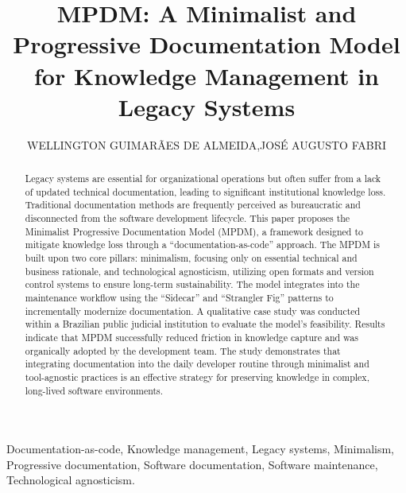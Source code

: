 \documentclass{ieeeaccess}
\begin{document}

\title{MPDM: A Minimalist and Progressive Documentation Model for Knowledge Management in Legacy Systems}

\author{\uppercase{Wellington Guimarães de Almeida},\uppercase{José Augusto Fabri}}

\address[1]{Graduate Program in Informatics (PPGI), Federal University of Technology -- Paraná (UTFPR), Cornélio Procópio, PR 86300-000, Brazil (e-mail: fabri@utfpr.edu.br)}
\address[2]{Regional Labor Court of the 3rd Region (TRT-MG), Belo Horizonte, MG 30170-910, Brazil (e-mail: walmeida@trt3.jus.br)}


\begin{abstract}
Legacy systems are essential for organizational operations but often suffer from a lack of updated technical documentation, leading to significant institutional knowledge loss. Traditional documentation methods are frequently perceived as bureaucratic and disconnected from the software development lifecycle. This paper proposes the Minimalist Progressive Documentation Model (MPDM), a framework designed to mitigate knowledge loss through a ``documentation-as-code'' approach. The MPDM is built upon two core pillars: minimalism, focusing only on essential technical and business rationale, and technological agnosticism, utilizing open formats and version control systems to ensure long-term sustainability. The model integrates into the maintenance workflow using the ``Sidecar'' and ``Strangler Fig'' patterns to incrementally modernize documentation. A qualitative case study was conducted within a Brazilian public judicial institution to evaluate the model’s feasibility. Results indicate that MPDM successfully reduced friction in knowledge capture and was organically adopted by the development team. The study demonstrates that integrating documentation into the daily developer routine through minimalist and tool-agnostic practices is an effective strategy for preserving knowledge in complex, long-lived software environments.

\end{abstract}

\begin{keywords}
Documentation-as-code, Knowledge management, Legacy systems, Minimalism, Progressive documentation, Software documentation, Software maintenance, Technological agnosticism.
\end{keywords}
\end{document}
